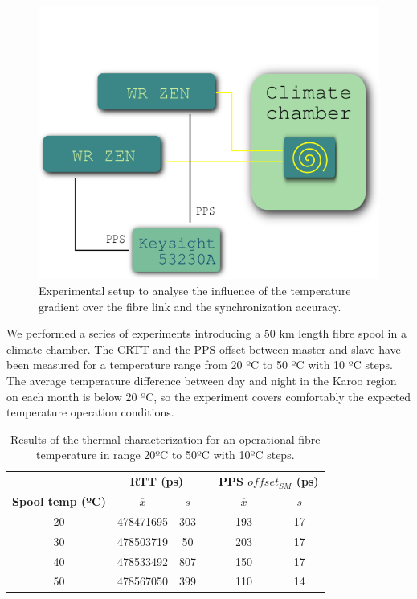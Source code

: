 \begin{figure}
	\centering
	\includegraphics[width=0.7\linewidth]{img/tempsetup}
	\caption[Configuration of the climate chamber experiments]{Experimental 
		setup to analyse the influence of the temperature gradient over the 
		fibre link and the synchronization accuracy.}
	\label{fig:tempsetup}
\end{figure}

We performed a series of experiments introducing a 50 km length fibre spool in 
a climate chamber. The CRTT and the PPS offset between master and slave have 
been measured for a temperature range from 20 ºC to 50 ºC with 10 ºC steps. 
The average temperature difference between day and night in the Karoo region on 
each month is below 20 ºC, so the experiment covers comfortably the expected 
temperature operation conditions.

\begin{table}\centering
	\begin{tabular}{@{} cccccc@{}}%
		& \multicolumn{2}{c}{\bfseries{RTT (ps)}} & &
		\multicolumn{2}{c}{\bfseries{PPS $offset_{SM}$ (ps)}} \\
		\cmidrule(l){2-3}  \cmidrule{5-6}
		\textbf{Spool temp (ºC)} & $\overline{x}$ & $s$ & & $\overline{x}$ 
		& $s$ \\ \midrule
		\small{20} & 478471695 & 303 & & 193 & 17 \\
		\small{30} & 478503719 & 50  & & 203 & 17 \\
		\small{40} & 478533492 & 807 & & 150 & 17 \\
		\small{50} & 478567050 & 399 & & 110 & 14 \\
		\bottomrule
	\end{tabular}
	\caption{Results of the thermal characterization for an operational fibre 
		temperature in range 20ºC to 50ºC with 10ºC steps.}
	\label{tab:temp}
\end{table}

